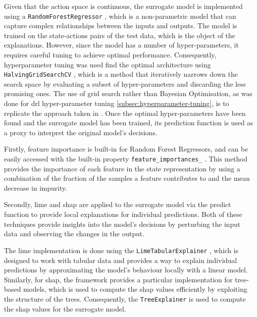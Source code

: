 Given that the action space is continuous, the surrogate model is implemented using a \texttt{RandomForestRegressor} \cite{sklearnRandomForest}, which is a non-parametric model that can capture complex relationships between the inputs and outputs. The model is trained on the state-actions pairs of the test data, which is the object of the explanations. However, since the model has a number of hyper-parameters, it requires careful tuning to achieve optimal performance. Consequently, hyperparameter tuning was used find the optimal architecture using \texttt{HalvingGridSearchCV} \cite{sklearnHalvingGridSearch}, which is a method that iteratively narrows down the search space by evaluating a subset of hyper-parameters and discarding the less promising ones. The use of grid search rather than Bayesian Optimisation, as was done for \acrshort{drl} hyper-parameter tuning \ref{subsec:hyperparameter-tuning}, is to replicate the approach taken in \cite{de-La-Rica-Escudero2025}. Once the optimal hyper-parameters have been found and the surrogate model has been trained, its prediction function is used as a proxy to interpret the original model's decisions.

Firstly, feature importance is built-in for Random Forest Regressors, and can be easily accessed with the built-in property \texttt{feature\_importances\_} \cite{sklearnFeatureImportance}. This method provides the importance of each feature in the state representation by using a combination of the fraction of the samples a feature contributes to and the mean decrease in impurity.

Secondly, \acrshort{lime} and \acrshort{shap} are applied to the surrogate model via the predict function to provide local explanations for individual predictions. Both of these techniques provide insights into the model's decisions by perturbing the input data and observing the changes in the output. 

The \acrshort{lime} implementation is done using the \texttt{LimeTabularExplainer} \cite{LimeTabularExplainer}, which is designed to work with tabular data and provides a way to explain individual predictions by approximating the model's behaviour locally with a linear model. Similarly, for \acrshort{shap}, the framework provides a particular implementation for tree-based models, which is used to compute the \acrshort{shap} values efficiently by exploiting the structure of the trees. Consequently, the \texttt{TreeExplainer} \cite{ShapTreeExplainer} is used to compute the \acrshort{shap} values for the surrogate model.

